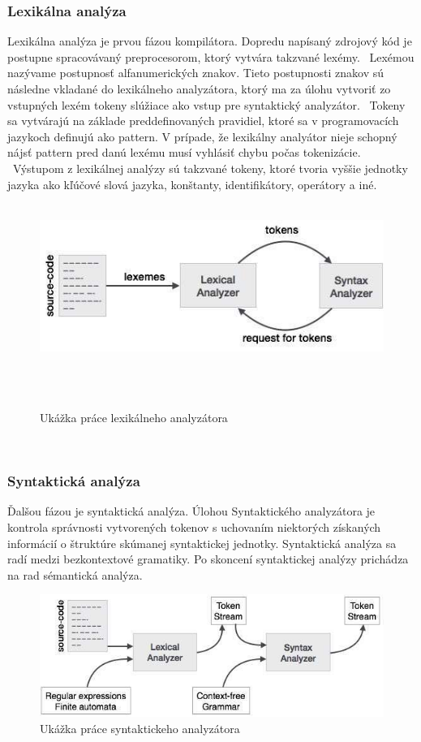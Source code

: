 \subsubsection{Lexikálna analýza}
	\indent Lexikálna analýza je prvou fázou kompilátora. Dopredu napísaný zdrojový kód je postupne spracovávaný preprocesorom, ktorý vytvára takzvané lexémy. 
	 \newline Lexémou nazývame postupnosť alfanumerických znakov. Tieto postupnosti znakov sú následne vkladané do lexikálneho analyzátora, ktorý ma za úlohu vytvoriť zo vstupných lexém tokeny slúžiace ako vstup pre syntaktický analyzátor. 
	 \newline Tokeny sa vytvárajú na základe preddefinovaných pravidiel, ktoré sa v programovacích jazykoch definujú ako pattern. V prípade, že lexikálny analyátor nieje schopný nájsť  pattern pred danú lexému musí vyhlásiť chybu počas tokenizácie.  
	 \newline Výstupom z lexikálnej analýzy sú takzvané tokeny, ktoré tvoria vyššie jednotky jazyka ako kľúčové slová jazyka, konštanty, identifikátory, operátory a iné.\cite{gram}
	 
	 \begin{figure}[H]
	 	\centering
	 	\includegraphics[width=15cm]{img/lexical_analysis.jpg}
	 	\caption{Ukážka práce lexikálneho analyzátora}
	 	\label{fig:test}
	 \end{figure}

 
\subsubsection{Syntaktická analýza}
\indent Ďalšou fázou je syntaktická analýza. Úlohou Syntaktického analyzátora je kontrola správnosti vytvorených tokenov s uchovaním niektorých získaných informácií o štruktúre skúmanej syntaktickej jednotky. Syntaktická analýza sa radí medzi bezkontextové gramatiky. Po skoncení syntaktickej analýzy prichádza na rad sémantická analýza.\cite{gram}
\begin{figure}[H]
	\centering
	\includegraphics[width=15cm]{img/syntax_analyzer.jpg}
	\caption{Ukážka práce syntaktickeho  analyzátora}
	\label{fig:test}
\end{figure}

